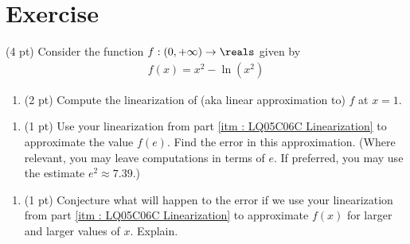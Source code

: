 %
%
%
%

\section{Exercise}


(4 pt) Consider the function $f : (0,+\infty) \rightarrow \reals$ given by
\begin{align*}
f(x)
=
x^{2} - \ln(x^{2})
\end{align*}

\begin{enumerate}[label=(\alph*)]
\item\label{itm : LQ05C06C Linearization} (2 pt) Compute the linearization of (aka linear approximation to) $f$ at $x = 1$.
\end{enumerate}

\spaceSolution{3.5in}{%
}%



\begin{enumerate}[resume,label=(\alph*)]
\item\label{itm : LQ05C06C Approximation Error} (1 pt) Use your linearization from part \ref{itm : LQ05C06C Linearization} to approximate the value $f(e)$. Find the error in this approximation. (Where relevant, you may leave computations in terms of $e$. If preferred, you may use the estimate $e^{2} \approx 7.39$.)
\end{enumerate}

\spaceSolution{1.5in}{%
}%



\begin{enumerate}[resume,label=(\alph*)]
\item\label{itm : LQ05C06C Approximation} (1 pt) Conjecture what will happen to the error if we use your linearization from part \ref{itm : LQ05C06C Linearization} to approximate $f(x)$ for larger and larger values of $x$. Explain.
\end{enumerate}

\spaceSolution{1in}{%
}%